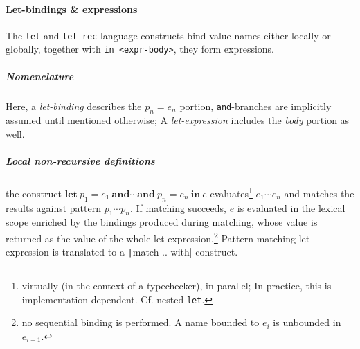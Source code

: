 \documentclass[a4paper, 11pt]{article}
\theoremstyle{remark}\newtheorem*{remark}{Remark}
\theoremstyle{definition}\newtheorem*{definition}{Definition}
\begin{document}
\paragraph{Let-bindings \& expressions}
The \texttt{let} and \texttt{let rec} language constructs bind value names either locally or globally,
together with \texttt{in <expr-body>}, they form expressions.
\subparagraph{Nomenclature} Here, a \emph{let-binding} describes the \(p_n = e_n\) portion, \texttt{and}-branches
are implicitly assumed until mentioned otherwise; A \emph{let-expression} includes the \emph{body} portion as well.
\subparagraph{Local non-recursive definitions} the construct
\(\mathbf{let}\ p_1 = e_1\ \mathbf{and}\cdots\mathbf{and}\ p_n = e_n\ \mathbf{in}\ e\)
evaluates\footnote{virtually (in the context of a typechecker), in parallel; In practice, this is implementation-dependent. Cf. nested \texttt{let}.}
\(e_1\cdots e_n\) and matches the results against pattern \(p_1\cdots p_n\). If matching succeeds,
\(e\) is evaluated in the lexical scope enriched by the bindings produced during matching, whose value is
returned as the value of the whole let
expression.\footnote{
  no sequential binding is performed. A name bounded to \(e_{i}\) is unbounded in
  \(e_{i+1}\).
}
Pattern matching let-expression is translated to a \texttt|match .. with| construct.
\end{document}
